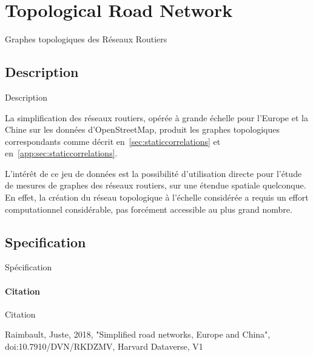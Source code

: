 








\section{Topological Road Network}{Graphes topologiques des Réseaux Routiers}


\subsection{Description}{Description}

La simplification des réseaux routiers, opérée à grande échelle pour l'Europe et la Chine sur les données d'OpenStreetMap, produit les graphes topologiques correspondants comme décrit en~\ref{sec:staticcorrelations} et en~\ref{app:sec:staticcorrelations}.

L'intérêt de ce jeu de données est la possibilité d'utilisation directe pour l'étude de mesures de graphes des réseaux routiers, sur une étendue spatiale quelconque. En effet, la création du réseau topologique à l'échelle considérée a requis un effort computationnel considérable, pas forcément accessible au plus grand nombre.




\subsection{Specification}{Spécification}

\paragraph{Citation}{Citation} 

Raimbault, Juste, 2018, "Simplified road networks, Europe and China", doi:10.7910/DVN/RKDZMV, Harvard Dataverse, V1

